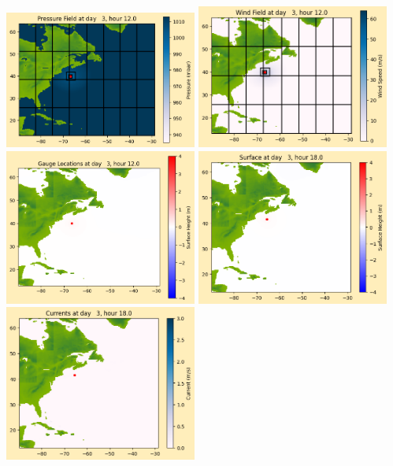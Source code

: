 \documentclass[11pt]{article}
\begin{document}
\includegraphics[width=0.475\textwidth]{frame0026fig1012.png}
\vskip 10pt 
\includegraphics[width=0.475\textwidth]{frame0026fig1013.png}
\includegraphics[width=0.475\textwidth]{frame0026fig1014.png}
\vskip 10pt 
\includegraphics[width=0.475\textwidth]{frame0027fig1001.png}
\includegraphics[width=0.475\textwidth]{frame0027fig1002.png}
\end{document}
